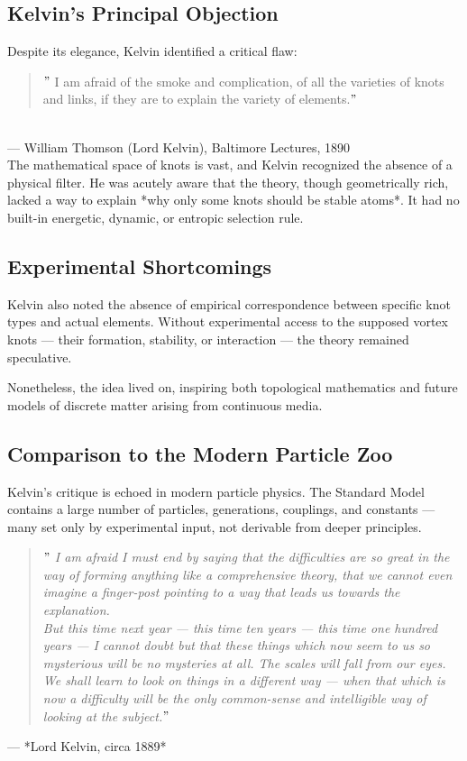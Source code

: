 \documentclass[preprint,notitlepage]{revtex4-2}
\begin{document}
    \subsection*{Kelvin's Principal Objection}

    Despite its elegance, Kelvin identified a critical flaw:

    \begin{quote}
    \("\) I am afraid of the smoke and complication, of all the varieties of knots and links, if they are to explain the variety of elements.\("\)
    \end{quote}\\
     \hfill — William Thomson (Lord Kelvin), Baltimore Lectures, 1890\\
    The mathematical space of knots is vast, and Kelvin recognized the absence of a physical filter. He was acutely aware that the theory, though geometrically rich, lacked a way to explain *why only some knots should be stable atoms*. It had no built-in energetic, dynamic, or entropic selection rule.

    \subsection*{Experimental Shortcomings}

    Kelvin also noted the absence of empirical correspondence between specific knot types and actual elements. Without experimental access to the supposed vortex knots — their formation, stability, or interaction — the theory remained speculative.

    Nonetheless, the idea lived on, inspiring both topological mathematics and future models of discrete matter arising from continuous media.

    \subsection*{Comparison to the Modern Particle Zoo}

    Kelvin's critique is echoed in modern particle physics. The Standard Model contains a large number of particles, generations, couplings, and constants — many set only by experimental input, not derivable from deeper principles.

    \begin{quote}
    \textit{\("\) I am afraid I must end by saying that the difficulties are so great in the way of forming anything like a comprehensive theory, that we cannot even imagine a finger-post pointing to a way that leads us towards the explanation.} \\
    \textit{But this time next year — this time ten years — this time one hundred years — I cannot doubt but that these things which now seem to us so mysterious will be no mysteries at all. The scales will fall from our eyes. We shall learn to look on things in a different way — when that which is now a difficulty will be the only common-sense and intelligible way of looking at the subject.\("\)}
    \end{quote}
    \hfill — *Lord Kelvin, circa 1889*
\end{document}
